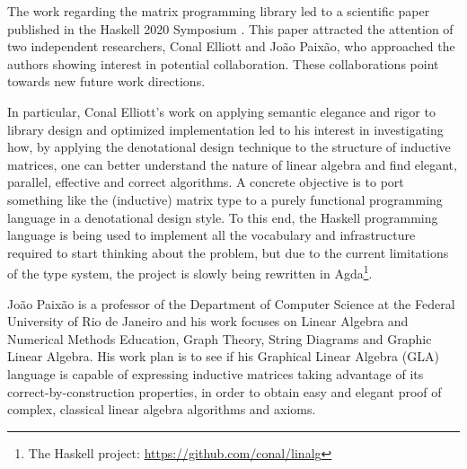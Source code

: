 \documentclass[
  oneside,
  11pt, a4paper,
  footinclude=true,
  headinclude=true,
  cleardoublepage=empty
]{scrbook}
\theoremstyle{definition}
\theoremstyle{definition}
\begin{document}
	    The work regarding the matrix programming library led to a scientific paper published in the Haskell 2020 Symposium \citep{Armando2020}. This paper attracted the attention of 
	    two independent researchers, Conal Elliott and João Paixão, who approached the authors showing interest in potential collaboration. These collaborations point towards new future work directions.
	    
	    In particular, Conal Elliott's work on applying semantic elegance and rigor to library design and optimized implementation led to his interest in investigating how, by applying the denotational design technique to the structure of inductive matrices, one can better understand the nature of linear algebra and find elegant, parallel, effective and correct algorithms. A concrete objective is to port something like the (inductive) matrix type to a purely functional programming language in a denotational design style. To this end, the Haskell programming language is being used to implement all the vocabulary and infrastructure required to start thinking about the problem, but due to the current limitations of the type system, the project is slowly being rewritten in Agda\footnote{The Haskell project: \href{https://github.com/conal/linalg}{https://github.com/conal/linalg}}.
	    
	    João Paixão is a professor of the Department of Computer Science at the Federal University of Rio de Janeiro and his work focuses on Linear Algebra and Numerical Methods Education, Graph Theory, String Diagrams and Graphic Linear Algebra. His work plan is to see if his Graphical Linear Algebra (GLA) language \citep{paixao2020calculational} is capable of expressing inductive matrices taking advantage of its correct-by-construction properties, in order to obtain easy and elegant proof of complex, classical linear algebra algorithms and axioms.
	     

	

	
	
	
\end{document}
